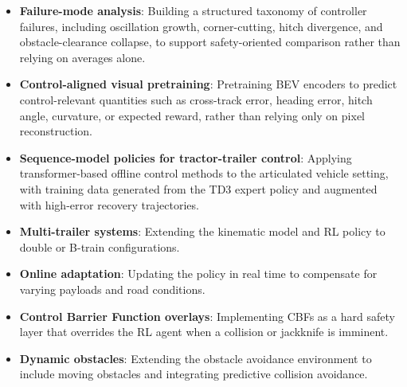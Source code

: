 \begin{itemize}
    \item \textbf{Failure-mode analysis}: Building a structured taxonomy of controller failures, including oscillation growth, corner-cutting, hitch divergence, and obstacle-clearance collapse, to support safety-oriented comparison rather than relying on averages alone.
    \item \textbf{Control-aligned visual pretraining}: Pretraining BEV encoders to predict control-relevant quantities such as cross-track error, heading error, hitch angle, curvature, or expected reward, rather than relying only on pixel reconstruction.
    \item \textbf{Sequence-model policies for tractor-trailer control}: Applying transformer-based offline control methods to the articulated vehicle setting, with training data generated from the TD3 expert policy and augmented with high-error recovery trajectories.
    \item \textbf{Multi-trailer systems}: Extending the kinematic model and RL policy to double or B-train configurations.
    \item \textbf{Online adaptation}: Updating the policy in real time to compensate for varying payloads and road conditions.
    \item \textbf{Control Barrier Function overlays}: Implementing CBFs as a hard safety layer that overrides the RL agent when a collision or jackknife is imminent.
    \item \textbf{Dynamic obstacles}: Extending the obstacle avoidance environment to include moving obstacles and integrating predictive collision avoidance.
\end{itemize}
